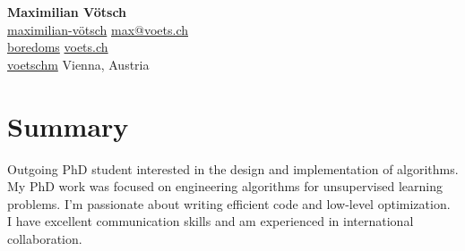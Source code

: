 \documentclass[a4paper, 10pt]{article}
\newcommand{\iconSpace}{\hspace{2px}}
\newcommand{\hSpace}{\hspace{8px}}
\newcommand{\secStartSpace}{\vspace{3pt}}
\newcommand{\secEndSpace}{\vspace{5pt}}
\newcommand{\spaceCollapse}{\vspace{-2pt}}
\begin{document}
\begin{center} 
	{\Huge \color{highlight} \textbf{Maximilian V\"otsch}}\\
	\vspace{1px}
 \color{text-color}
	{
		\color{secondary}
             \iconSpace \href{https://www.linkedin.com/in/maximilian-vötsch/}{maximilian-vötsch}
		\hfill
		\href{mailto:max@voets.ch}{max@voets.ch} \vspace{2pt} \iconSpace {} 
        }\\
	{
        \color{secondary}
			 \iconSpace \href{https://github.com/boredoms}{boredoms}
        \hfill
		\href{https://voets.ch/}{voets.ch} \vspace{2pt} \iconSpace {} 
		}\\
	{
		\color{secondary}
			 \iconSpace \href{https://gitlab.com/voetschm}{voetschm}
		\hfill
		Vienna, Austria \vspace{2pt} \iconSpace {}
	}
\end{center}
\spaceCollapse
\spaceCollapse


\section{\color{highlight} \textbf{Summary}}
\secStartSpace
\begin{addmargin}[0.5em]{1em}
	Outgoing PhD student interested in the design and implementation of algorithms.
	My PhD work was focused on engineering algorithms for unsupervised learning problems.
	I'm passionate about writing efficient code and low-level optimization.
	I have excellent communication skills and am experienced in international collaboration.
\end{addmargin}
\secEndSpace
\secEndSpace


\end{document}
